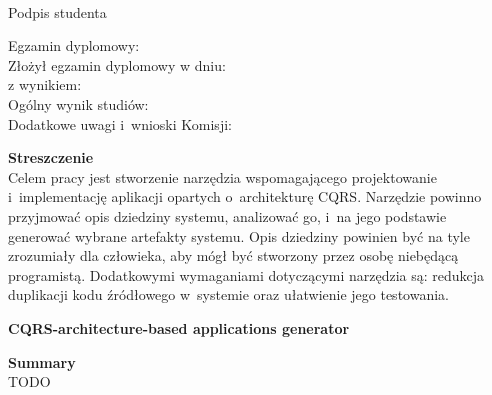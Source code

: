 \vspace{2cm}

\begin{flushright}
 \begin{minipage}{5cm}
  \dotfill \\[-0.7cm]
  \begin{center}
  \small Podpis studenta
  \end{center}
 \end{minipage}
\end{flushright}

\vspace{4cm}

\begin{flushleft}
 Egzamin dyplomowy: \\
 Złożył egzamin dyplomowy w dniu: \dotfill \\
 z wynikiem: \dotfill \\
 Ogólny wynik studiów: \dotfill \\
 Dodatkowe uwagi i~wnioski Komisji: \dotfill \\
 \hspace{0cm} \dotfill
\end{flushleft}

 
\newpage
\thispagestyle{empty}

\textbf{Streszczenie} \\

Celem pracy jest stworzenie narzędzia wspomagającego projektowanie i~implementację aplikacji opartych o~architekturę CQRS.
Narzędzie powinno przyjmować opis dziedziny systemu, analizować go, i~na jego podstawie generować wybrane artefakty systemu.
Opis dziedziny powinien być na tyle zrozumiały dla człowieka, aby mógł być stworzony przez osobę niebędącą programistą.
Dodatkowymi wymaganiami dotyczącymi narzędzia są: redukcja duplikacji kodu źródłowego w~systemie oraz ułatwienie jego testowania.


\begin{center}
 \large \textbf{CQRS-architecture-based applications generator}
\end{center}

\vspace*{1cm}

\textbf{Summary} \\

TODO

